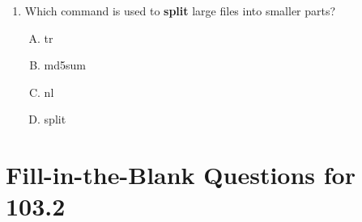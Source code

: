\documentclass[a4paper]{report}
\begin{document}
\begin{enumerate}[1.]
    \item Which command is used to \textbf{split} large files into smaller parts?  
    \begin{enumerate}[A)]
        \item tr  
        \item md5sum  
        \item nl  
        \item split  
    \end{enumerate}

\end{enumerate}

\newpage
\section*{Fill-in-the-Blank Questions for 103.2}
\end{document}
